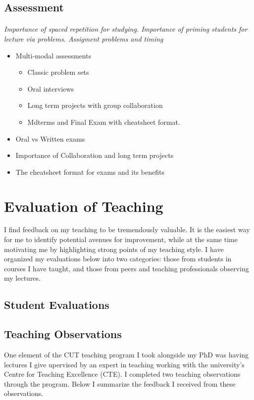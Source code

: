 \documentclass{article}
\begin{document}
\subsection{Assessment}

\paragraph{} \textit{Importance of spaced repetition for studying. Importance of priming students for lecture via problems. Assigment problems and timing}
\begin{itemize}
    \item Multi-modal assessments
    \begin{itemize}
        \item Classic problem sets
        \item Oral interviews
        \item Long term projects with group collaboration
        \item Mdterms and Final Exam with cheatsheet format.
    \end{itemize}
    \item Oral vs Written exams
    \item Importance of Collaboration and long term projects
    \item The cheatsheet format for exams and its benefits
\end{itemize}
\section{Evaluation of Teaching}
I find feedback on my teaching to be tremendously valuable. It is the easiest way for me to identify potential avenues for improvement, while at the same time motivating me by highlighting strong points of my teaching style. I have organized my evaluations below into two categories: those from students in courses I have taught, and those from peers and teaching professionals observing my lectures.
\subsection{Student Evaluations}
\subsection{Teaching Observations}
One element of the CUT teaching program I took alongside my PhD was having lectures I give upervised by an expert in teaching working with the university's Centre for Teaching Excellence (CTE). I completed two teaching observations through the program. Below I summarize the feedback I received from these observations.
\end{document}
